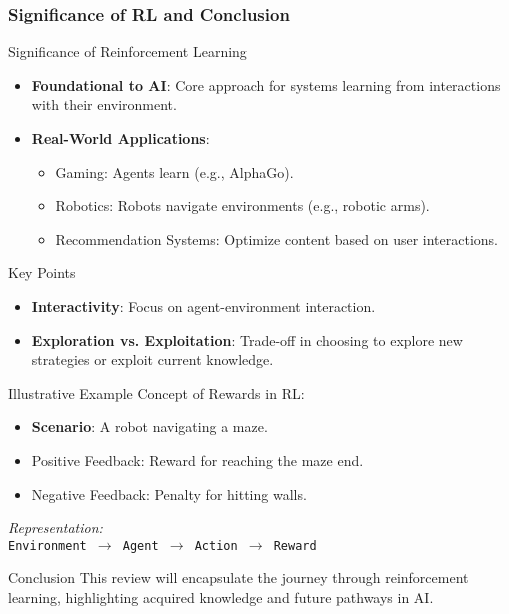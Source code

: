 \documentclass{beamer}
\begin{document}
\begin{frame}[fragile]
    \frametitle{Significance of RL and Conclusion}
    \begin{block}{Significance of Reinforcement Learning}
        \begin{itemize}
            \item \textbf{Foundational to AI}: Core approach for systems learning from interactions with their environment.
            \item \textbf{Real-World Applications}:
            \begin{itemize}
                \item Gaming: Agents learn (e.g., AlphaGo).
                \item Robotics: Robots navigate environments (e.g., robotic arms).
                \item Recommendation Systems: Optimize content based on user interactions.
            \end{itemize}
        \end{itemize}
    \end{block}
    
    \begin{block}{Key Points}
        \begin{itemize}
            \item \textbf{Interactivity}: Focus on agent-environment interaction.
            \item \textbf{Exploration vs. Exploitation}: Trade-off in choosing to explore new strategies or exploit current knowledge.
        \end{itemize}
    \end{block}
    
    \begin{block}{Illustrative Example}
        Concept of Rewards in RL:
        \begin{itemize}
            \item \textbf{Scenario}: A robot navigating a maze.
            \item Positive Feedback: Reward for reaching the maze end.
            \item Negative Feedback: Penalty for hitting walls.
        \end{itemize}
        \textit{Representation:} \\
        \texttt{Environment $\to$ Agent $\to$ Action $\to$ Reward}
    \end{block}
    
    \begin{block}{Conclusion}
        This review will encapsulate the journey through reinforcement learning, highlighting acquired knowledge and future pathways in AI.
    \end{block}
\end{frame}
\end{document}

